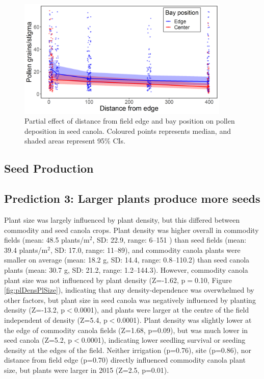 \documentclass[12pt]{article} %
\begin{document}
\begin{figure} 
    \centering
    \includegraphics[width=0.9\textwidth,keepaspectratio=true]{slopeDistCentPol.png}
    \caption[Partial effect of distance from field edge and bay position on pollen deposition in seed canola]{Partial effect of distance from field edge and bay position on pollen deposition in seed canola. Coloured points represents median, and shaded areas represent 95\% CIs.}
    \label{fig:distCentPol}
\end{figure}

\subsection{Seed Production}

\subsection{Prediction 3: Larger plants produce more seeds} 

Plant size was largely influenced by plant density, but this differed between commodity and seed canola crops.
Plant density was higher overall in commodity fields (mean: 48.5 plants/m$^2$, SD: 22.9, range: 6--151 ) than seed fields (mean: 39.4 plants/m$^2$, SD: 17.0, range: 11--89), and commodity canola plants were smaller on average (mean: 18.2 g, SD: 14.4, range: 0.8--110.2) than seed canola plants (mean: 30.7 g, SD: 21.2, range: 1.2--144.3).
However, commodity canola plant size was not influenced by plant density (Z=-1.62, p$=$0.10, Figure \ref{fig:plDensPlSize}), indicating that any density-dependence was overwhelmed by other factors, but plant size in seed canola was negatively influenced by planting density (Z=-13.2, p$<$0.0001), and plants were larger at the centre of the field independent of density (Z=5.4, p$<$0.0001).%
Plant density was slightly lower at the edge of commodity canola fields (Z=1.68, p=0.09), but was much lower in seed canola (Z=5.2, p$<$0.0001), indicating lower seedling survival or seeding density at the edges of the field.
Neither irrigation (p=0.76), site (p=0.86), nor distance from field edge (p=0.70) directly influenced commodity canola plant size, but plants were larger in 2015 (Z=2.5, p=0.01). 
\end{document}
